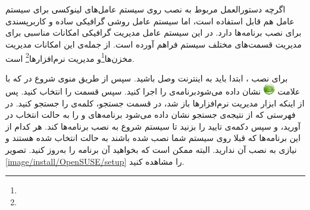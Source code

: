 %
% 
% 
% 
%
\section{}

اگرچه دستورالعمل مربوط به نصب  روی سیستم عامل‌های لینوکسی برای سیستم
عامل  هم قابل استفاده است، اما سیستم عامل  روشی
گرافیکی ساده و کاربرپسندی برای نصب برنامه‌ها دارد.
در این سیستم عامل مدیریت گرافیکی  امکانات مناسبی برای مدیریت قسمت‌های
مختلف سیستم فراهم آورده است.
از جمله‌ی این امکانات مدیریت مخزن‌ها\footnote{}و مدیریت
نرم‌افزارها\footnote{} است.

برای نصب ، ابتدا باید به اینترنت وصل باشید. سپس از طریق منوی شروع در
 که با علامت \includegraphics[width=0.5cm]{image/opensuse} نشان
داده می‌شودبرنامه‌ی  را اجرا کنید. سپس قسمت  را
انتخاب کنید. پس از اینکه ابزار مدیریت نرم‌افزارها باز شد، در قسمت جستجو، کلمه‌ی
 را جستجو کنید. در فهرستی که از نتیجه‌ی جستجو نشان داده می‌شود
برنامه‌های  و  را به حالت انتخاب در آورید، و سپس
دکمه‌ی تایید را بزنید تا سیستم شروع به نصب برنامه‌ها کند. هر کدام از این
برنامه‌ها که قبلا روی سیستم شما نصب شده باشند به حالت انتخاب شده هستند و نیازی
به نصب آن ندارید. البته ممکن است که بخواهید آن برنامه را به‌روز کنید. تصویر
\ref{image/install/OpenSUSE/setup} را مشاهده کنید.

